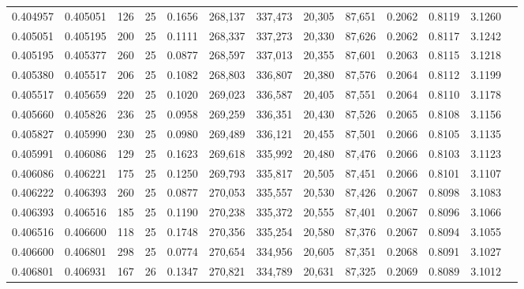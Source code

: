 \begin{tabular}{rrrrrrrrrrrrr}
0.404957 & 0.405051 &   126 &  25 &                                     0.1656 & 268,137 & 337,473 &  20,305 &  87,651 & 0.2062 & 0.8119 & 3.1260 \\
0.405051 & 0.405195 &   200 &  25 &                                     0.1111 & 268,337 & 337,273 &  20,330 &  87,626 & 0.2062 & 0.8117 & 3.1242 \\
0.405195 & 0.405377 &   260 &  25 &                                     0.0877 & 268,597 & 337,013 &  20,355 &  87,601 & 0.2063 & 0.8115 & 3.1218 \\
0.405380 & 0.405517 &   206 &  25 &                                     0.1082 & 268,803 & 336,807 &  20,380 &  87,576 & 0.2064 & 0.8112 & 3.1199 \\
0.405517 & 0.405659 &   220 &  25 &                                     0.1020 & 269,023 & 336,587 &  20,405 &  87,551 & 0.2064 & 0.8110 & 3.1178 \\
0.405660 & 0.405826 &   236 &  25 &                                     0.0958 & 269,259 & 336,351 &  20,430 &  87,526 & 0.2065 & 0.8108 & 3.1156 \\
0.405827 & 0.405990 &   230 &  25 &                                     0.0980 & 269,489 & 336,121 &  20,455 &  87,501 & 0.2066 & 0.8105 & 3.1135 \\
0.405991 & 0.406086 &   129 &  25 &                                     0.1623 & 269,618 & 335,992 &  20,480 &  87,476 & 0.2066 & 0.8103 & 3.1123 \\
0.406086 & 0.406221 &   175 &  25 &                                     0.1250 & 269,793 & 335,817 &  20,505 &  87,451 & 0.2066 & 0.8101 & 3.1107 \\
0.406222 & 0.406393 &   260 &  25 &                                     0.0877 & 270,053 & 335,557 &  20,530 &  87,426 & 0.2067 & 0.8098 & 3.1083 \\
0.406393 & 0.406516 &   185 &  25 &                                     0.1190 & 270,238 & 335,372 &  20,555 &  87,401 & 0.2067 & 0.8096 & 3.1066 \\
0.406516 & 0.406600 &   118 &  25 &                                     0.1748 & 270,356 & 335,254 &  20,580 &  87,376 & 0.2067 & 0.8094 & 3.1055 \\
0.406600 & 0.406801 &   298 &  25 &                                     0.0774 & 270,654 & 334,956 &  20,605 &  87,351 & 0.2068 & 0.8091 & 3.1027 \\
0.406801 & 0.406931 &   167 &  26 &                                     0.1347 & 270,821 & 334,789 &  20,631 &  87,325 & 0.2069 & 0.8089 & 3.1012 \\

\end{tabular}
